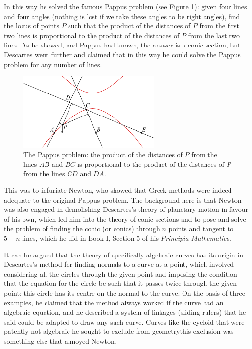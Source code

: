  In this way he solved the famous Pappus problem (see Figure \ref{figPappusproblem}): given four lines and four angles (nothing is lost if we take these angles to be right angles), find the locus of points $P$ such that the product of the distances of $P$ from the first two lines is proportional to the product of the distances of $P$ from the last two lines. As he showed, and Pappus had known, the answer is a conic section, but  Descartes went further and claimed that in this way he could solve the Pappus problem for any number of lines. 
 
\begin{figure}
\includegraphics[width=200pt]{main/Pappusproblem} 
\caption{The Pappus problem: the product of the distances of $P$ from the lines $AB$ and $BC$ is proportional to the product of the distances of $P$ from the lines $CD$ and $DA$.}
\label{figPappusproblem}
\end{figure}

This was to infuriate Newton, who showed that Greek methods were indeed adequate to the original Pappus problem. The background here is that Newton was also engaged in demolishing Descartes's theory of planetary motion in favour of his own, which led him into the theory of conic sections and to pose and solve the problem of finding the conic (or conics) through $n$ points and tangent to $5-n$ lines, which he did in Book I, Section 5 of his \emph{Principia Mathematica}.~\label{Newtonconics}

It can be argued that the theory of specifically algebraic curves has its origin in Descartes's method for finding normals to a curve at a point, which  involved considering all the circles through the given point and imposing the condition that the equation for the circle be such that it passes twice through the given point; this circle has its centre on the normal to the curve. On the basis of three examples, he claimed that the method always worked  if the curve had an algebraic equation, and he described a system of linkages (sliding rulers) that he said could be adapted to draw any such curve. Curves like the cycloid that were patently not algebraic he sought to exclude from geometry\emdash this exclusion was something else that annoyed Newton.

